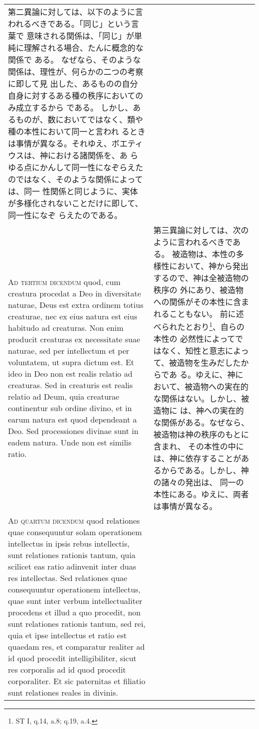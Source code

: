 \documentclass[10pt]{jsarticle} %
\begin{document}
\begin{longtable}{p{21em}p{21em}}
第二異論に対しては、以下のように言われるべきである。「同じ」という言葉で
 意味される関係は、「同じ」が単純に理解される場合、たんに概念的な関係で
 ある。
なぜなら、そのような関係は、理性が、何らかの二つの考察に即して見
 出した、あるものの自分自身に対するある種の秩序においてのみ成立するから
 である。
しかし、あるものが、数においてではなく、類や種の本性において同一と言われ
 るときは事情が異なる。それゆえ、ボエティウスは、神における諸関係を、あ
 らゆる点にかんして同一性になぞらえたのではなく、そのような関係によっては、同一
 性関係と同じように、実体が多様化されないことだけに即して、同一性になぞ
 らえたのである。




\\



{\scshape Ad tertium dicendum} quod, cum creatura procedat a Deo in diversitate
naturae, Deus est extra ordinem totius creaturae, nec ex eius natura est
eius habitudo ad creaturas. Non enim producit creaturas ex necessitate
suae naturae, sed per intellectum et per voluntatem, ut supra dictum
est. Et ideo in Deo non est realis relatio ad creaturas. Sed in
creaturis est realis relatio ad Deum, quia creaturae continentur sub
ordine divino, et in earum natura est quod dependeant a Deo. Sed
processiones divinae sunt in eadem natura. Unde non est similis ratio.


&

第三異論に対しては、次のように言われるべきである。
被造物は、本性の多様性において、神から発出するので、神は全被造物の秩序の
 外にあり、被造物への関係がその本性に含まれることもない。
前に述べられたとおり\footnote{ST I, q.14, a.8; q.19, a.4.}、自らの本性の
 必然性によってではなく、知性と意志によって、被造物を生みだしたからであ
 る。ゆえに、神において、被造物への実在的な関係はない。しかし、被造物に
 は、神への実在的な関係がある。なぜなら、被造物は神の秩序のもとに含まれ、
 その本性の中には、神に依存することがあるからである。しかし、神の諸々の発出は、
 同一の本性にある。ゆえに、両者は事情が異なる。


\\



{\scshape Ad quartum dicendum} quod relationes quae consequuntur solam operationem
intellectus in ipsis rebus intellectis, sunt relationes rationis tantum,
quia scilicet eas ratio adinvenit inter duas res intellectas. Sed
relationes quae consequuntur operationem intellectus, quae sunt inter
verbum intellectualiter procedens et illud a quo procedit, non sunt
relationes rationis tantum, sed rei, quia et ipse intellectus et ratio
est quaedam res, et comparatur realiter ad id quod procedit
intelligibiliter, sicut res corporalis ad id quod procedit
corporaliter. Et sic paternitas et filiatio sunt relationes reales in
divinis.



\end{longtable}
\end{document}
